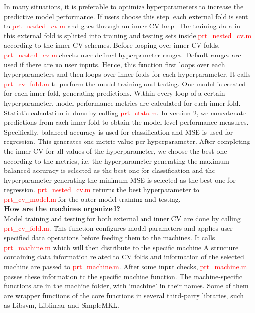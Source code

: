 In many situations, it is preferable to optimize hyperparameters to increase the predictive model performance. If users choose this step, each external fold is sent to \textcolor{red}{prt\_nested\_cv.m} and goes through an inner CV loop. The training data in this external fold is splitted into training and testing sets inside \textcolor{red}{prt\_nested\_cv.m} according to the inner CV schemes. Before looping over inner CV folds, \textcolor{red}{prt\_nested\_cv.m} checks user-defined hyperpameter ranges. Default ranges are used if there are no user inputs. Hence, this function first loops over each hyperparameters and then loops over inner folds for each hyperparameter. It calls \textcolor{red}{prt\_cv\_fold.m} to perform the model training and testing. One model is created for each inner fold, generating predictions. Within every loop of a certain hyperparameter, model performance metrics are calculated for each inner fold.
\\

Statistic calculation is done by calling \textcolor{red}{prt\_stats.m}. In version 2, we concatenate predictions from each inner fold to obtain the model-level performance measures. Specifically, balanced accuracy is used for classification and MSE is used for regression. This generates one metric value per hyperparameter. After completing the inner CV for all values of the hyperparameter, we choose the best one according to the metrics, i.e. the hyperparameter generating the maximum balanced accuracy is selected as the best one for classification and the hyperparameter generating the minimum MSE is selected as the best one for regression. \textcolor{red}{prt\_nested\_cv.m} returns the best hyperparameter to \textcolor{red}{prt\_cv\_model.m} for the outer model training and testing.
\\

\noindent \textbf{\underline{How are the machines organized?}}
\\

Model training and testing for both external and inner CV are done by calling \textcolor{red}{prt\_cv\_fold.m}. This function configures model parameters and applies user-specified data operations before feeding them to the machines. It calls \textcolor{red}{prt\_machine.m} which will then distribute to the specific machine A structure containing data information related to CV folds and information of the selected machine are passed to \textcolor{red}{prt\_machine.m}. After some input checks, \textcolor{red}{prt\_machine.m} passes these information to the specific machine function. The machine-specific functions are in the machine folder, with ‘machine’ in their names. Some of them are wrapper functions of the core functions in several third-party libraries, such as Libsvm, Liblinear and SimpleMKL.
\\

